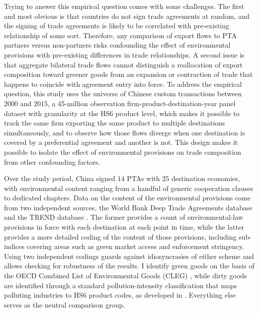 \documentclass[12pt]{article}
\begin{document}
Trying to answer this empirical question comes with some challenges. The first and most obvious is that countries do not sign trade agreements at random, and the signing of trade agreements is likely to be correlated with pre-existing relationship of some sort. Therefore, any comparison of export flows to PTA partners versus non-partners risks confounding the effect of environmental provisions with pre-existing differences in trade relationships. A second issue is that aggregate bilateral trade flows cannot distinguish a reallocation of export composition toward greener goods from an expansion or contraction of trade that happens to coincide with agreement entry into force. To address the empirical question, this study uses the universe of Chinese custom transactions between $2000$ and $2015$, a 45-million observation firm-product-destination-year panel dataset with granularity at the HS6 product level, which makes it possible to track the same firm exporting the same product to multiple destinations simultaneously, and to observe how those flows diverge when one destination is covered by a preferential agreement and another is not. This design makes it possible to isolate the effect of environmental provisions on trade composition from other confounding factors.

Over the study period, China signed $14$ PTAs with $25$ destination economies, with environmental content ranging from a handful of generic cooperation clauses to dedicated chapters. Data on the content of the environmental provisions come from two independent sources, the World Bank Deep Trade Agreements database \citep{hofmann2017} and the TREND database \citep{morin2018}. The former provides a count of environmental-law provisions in force with each destination at each point in time, while the latter provides a more detailed coding of the content of those provisions, including sub-indices covering areas such as green market access and enforcement stringency. Using two independent codings guards against idiosyncrasies of either scheme and allows checking for robustness of the results. I identify green goods on the basis of the OECD Combined List of Environmental Goods (CLEG) \citep{sauvage2014}, while dirty goods are identified through a standard pollution-intensity classification that maps polluting industries to HS6 product codes, as developed in \cite{mani1998}. Everything else serves as the neutral comparison group.
\end{document}
